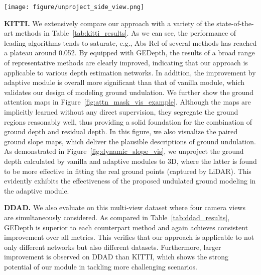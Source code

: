 \documentclass[10pt,twocolumn,letterpaper]{article}
\begin{document}
\begin{figure*}[!htb]
\centering
\texttt{[image: figure/unproject\_side\_view.png]}
 \caption{
Visualization of the side view of the ground depth unprojected to 3D in the uphill and downhill scenarios in KITTI. In each scene, the red and blue points respectively denote the ground depth computed by GEDepth-Vanilla and GEDepth-Adaptive, and the green points correspond to the ground-truth point clouds scanned by LiDAR. 
 }
 \label{fig:dynamic_slope_vis}
\end{figure*}

\noindent\textbf{KITTI.} We extensively compare our approach with a variety of the state-of-the-art methods in Table~\ref{tab:kitti_results}. As we can see, the performance of leading algorithms tends to saturate, e.g., Abs Rel of several methods has reached a plateau around 0.052. By equipped with GEDepth, the results of a broad range of representative methods are clearly improved, indicating that our approach is applicable to various depth estimation networks. In addition, the improvement by adaptive module is overall more significant than that of vanilla module, which validates our design of modeling ground undulation. We further show the ground attention maps in Figure~\ref{fig:attn_mask_vis_example}. Although the maps are implicitly learned without any direct supervision, they segregate the ground regions reasonably well, thus providing a solid foundation for the combination of ground depth and residual depth. In this figure, we also visualize the paired ground slope maps, which deliver the plausible descriptions of ground undulation. As demonstrated in Figure~\ref{fig:dynamic_slope_vis}, we unproject the ground depth calculated by vanilla and adaptive modules to 3D, where the latter is found to be more effective in fitting the real ground points (captured by LiDAR). This evidently exhibits the effectiveness of the proposed undulated ground modeling in the adaptive module.

\noindent\textbf{DDAD.} 
We also evaluate on this multi-view dataset where four camera views are simultaneously considered. As compared in Table~\ref{tab:ddad_results}, GEDepth is superior to each counterpart method and again achieves consistent improvement over all metrics. This verifies that our approach is applicable to not only different networks but also different datasets. Furthermore, larger improvement is observed on DDAD than KITTI, which shows the strong potential of our module in tackling more challenging scenarios. 
\end{document}
